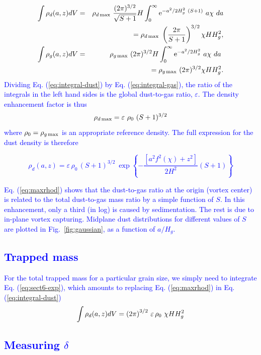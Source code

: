 \documentclass[apj]{emulateapj}
\def\blue#1{\textcolor{blue}{ #1}}
\newcommand{\Eq}[1]{Eq. (\ref{#1})}
\newcommand{\eq}[1]{\Eq{#1}}
\newcommand{\Fig}[1]{Fig.~\ref{#1}}
\newcommand{\fig}[1]{\Fig{#1}}
\newcommand{\beq}{\begin{equation}}
\newcommand{\eeq}{\end{equation}}
\newcommand{\beqn}{\begin{eqnarray}}
\newcommand{\eeqn}{\end{eqnarray}}
\begin{document}
\blue{
\beqn
\int\rho_d(a,z) dV  &=& \rho_{d\,{\rm max}} \ \frac{(2\pi)^{3/2}}{\sqrt{S+1}} H \int_0^\infty {\rm  e}^{-a^2/2H_g^2 \ (S+1)} \ a\chi \ da \notag\\
&&= \rho_{d\,{\rm max}} \ \left(\frac{2\pi}{S+1}\right)^{3/2} \chi H H_g^2, \label{eq:integral-dust}\\ 
%
\int\rho_g(a,z) dV  &=& \rho_{g\,{\rm max}} \ (2\pi)^{3/2} H \int_0^\infty {\rm e}^{-a^2/2H_g^2} \ a\chi \ da\ \notag\\
 &&= \rho_{g\,{\rm max}} \ (2\pi)^{3/2} \chi H H_g^2. \label{eq:integral-gas}\\
\eeqn 
\noindent Dividing \eq{eq:integral-dust} by \eq{eq:integral-gas}, the
ratio of the integrals in the left hand sides is the global dust-to-gas
ratio, $\varepsilon$. The density enhancement factor is thus
\beq
  \rho_{d\,{\rm max}} =  \varepsilon \ \rho_0 \ (S+1)^{3/2} \label{eq:maxrhod}
\eeq where $\rho_0=\rho_{g\,{\rm max}}$ is an appropriate reference
density. The full expression for the dust density is therefore} 

\blue{\beq
   \rho_d(a,z) = \varepsilon \, \rho_0 \, (S+1)^{3/2} \  \exp{\left\{-\frac{\left[a^2f^2(\chi) + z^2\right]}{2H^2}(S+1)\right\}} 
\label{eq:sect6-exp}
\eeq}

\blue{\eq{eq:maxrhod} shows that the dust-to-gas ratio at the origin (vortex center)
is related to the total dust-to-gas mass ratio by a simple function of $S$.  
In this enhancement, only a third (in log) is caused by sedimentation. The
rest is due to in-plane vortex capturing. Midplane dust
distributions for different values of \blue{$S$} are plotted in \fig{fig:gaussian}, as a 
function of $a/H_g$.} 

\blue{\subsection{Trapped mass}}

\blue{For the total trapped mass for a particular grain size, we simply need
to integrate \eq{eq:sect6-exp}, which amounts to replacing
\eq{eq:maxrhod} in \eq{eq:integral-dust}
 \beq
\int\rho_d(a,z) dV  = \left(2\pi\right)^{3/2} \, \varepsilon \, \rho_0 \ \chi H H_g^2 \label{eq:dust-mass}\\ 
\eeq
}


\blue{\subsection{Measuring $\delta$}}
\end{document}
